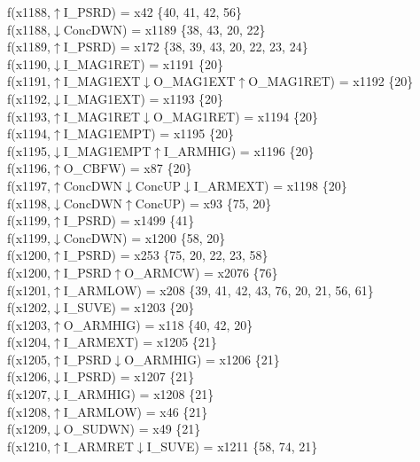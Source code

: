 f(x1188,$\uparrow$I\_PSRD) = x42 \{40, 41, 42, 56\} \\  
f(x1188,$\downarrow$ConcDWN) = x1189 \{38, 43, 20, 22\} \\  
f(x1189,$\uparrow$I\_PSRD) = x172 \{38, 39, 43, 20, 22, 23, 24\} \\  
f(x1190,$\downarrow$I\_MAG1RET) = x1191 \{20\} \\  
f(x1191,$\uparrow$I\_MAG1EXT$\downarrow$O\_MAG1EXT$\uparrow$O\_MAG1RET) = x1192 \{20\} \\  
f(x1192,$\downarrow$I\_MAG1EXT) = x1193 \{20\} \\  
f(x1193,$\uparrow$I\_MAG1RET$\downarrow$O\_MAG1RET) = x1194 \{20\} \\  
f(x1194,$\uparrow$I\_MAG1EMPT) = x1195 \{20\} \\  
f(x1195,$\downarrow$I\_MAG1EMPT$\uparrow$I\_ARMHIG) = x1196 \{20\} \\  
f(x1196,$\uparrow$O\_CBFW) = x87 \{20\} \\  
f(x1197,$\uparrow$ConcDWN$\downarrow$ConcUP$\downarrow$I\_ARMEXT) = x1198 \{20\} \\  
f(x1198,$\downarrow$ConcDWN$\uparrow$ConcUP) = x93 \{75, 20\} \\  
f(x1199,$\uparrow$I\_PSRD) = x1499 \{41\} \\  
f(x1199,$\downarrow$ConcDWN) = x1200 \{58, 20\} \\  
f(x1200,$\uparrow$I\_PSRD) = x253 \{75, 20, 22, 23, 58\} \\  
f(x1200,$\uparrow$I\_PSRD$\uparrow$O\_ARMCW) = x2076 \{76\} \\  
f(x1201,$\uparrow$I\_ARMLOW) = x208 \{39, 41, 42, 43, 76, 20, 21, 56, 61\} \\  
f(x1202,$\downarrow$I\_SUVE) = x1203 \{20\} \\  
f(x1203,$\uparrow$O\_ARMHIG) = x118 \{40, 42, 20\} \\  
f(x1204,$\uparrow$I\_ARMEXT) = x1205 \{21\} \\  
f(x1205,$\uparrow$I\_PSRD$\downarrow$O\_ARMHIG) = x1206 \{21\} \\  
f(x1206,$\downarrow$I\_PSRD) = x1207 \{21\} \\  
f(x1207,$\downarrow$I\_ARMHIG) = x1208 \{21\} \\  
f(x1208,$\uparrow$I\_ARMLOW) = x46 \{21\} \\  
f(x1209,$\downarrow$O\_SUDWN) = x49 \{21\} \\  
f(x1210,$\uparrow$I\_ARMRET$\downarrow$I\_SUVE) = x1211 \{58, 74, 21\} \\  

